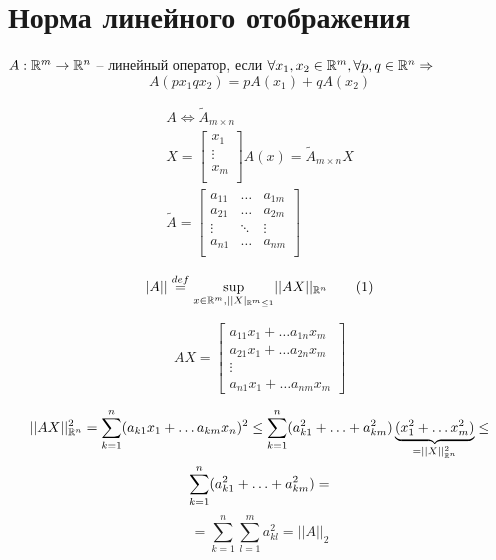 \documentclass[main]{subfiles}
\begin{document}
\chapter{Норма линейного отображения}
\begin{definition}
    $A: {\mathbb{R}}^m \rightarrow {\mathbb{R}}^n$ -- линейный оператор, если
    $ \forall x_1, x_2 \in {\mathbb{R}}^m, \forall p, q \in {\mathbb{R}}^n \Rightarrow$
    \[A(px_1 qx_2) = pA(x_1) + qA(x_2)\]
\end{definition}
\begin{gather*}
    A \Leftrightarrow \tilde{A}_{m \times n} \\
    X =
        \begin{bmatrix}
            x_1 \\
            \vdots \\
            x_m  \\
        \end{bmatrix}
    A(x) = \tilde{A}_{m \times n} X \\
    \tilde{A} = 
    \begin{bmatrix}
        a_{11} & \ldots & a_{1m} \\
        a_{21} & \ldots & a_{2m} \\
        \vdots & \ddots & \vdots \\
        a_{n1} & \ldots & a_{nm} \\
    \end{bmatrix}
\end{gather*}

\begin{definition}
    \[|A|| \stackrel{def}{=} \underset{x \in {\mathbb{R}}^m, ||X|_{{\mathbb{R}}^m \leq 1}}{\sup}
     {||AX||_{{\mathbb{R}}^n}} \tag{1} \]
\end{definition}


\[AX = \begin{bmatrix}
    a_{11}x_1 + \ldots a_{1n}x_m \\
    a_{21}x_1 + \ldots a_{2n}x_m \\
    \vdots \\
    a_{n1}x_1 + \ldots a_{nm}x_m
\end{bmatrix}\]



\begin{multline*}
    ||AX||^2_{{\mathbb{R}}^n} = \sum_{k=1}^n(a_{k1}x_1 + \ldots a_{km}x_n)^2 \leq 
    \sum_{k=1}^n (a^2_{k1} + \ldots + a^2_{km})\underbrace{(x_1^2 + \ldots x_m^2)}_{=||X||^2_{{\mathbb{R}}^n}} \leq \\
    \sum_{k=1}^n (a^2_{k1} + \ldots + a^2_{km}) =
\end{multline*}
     \[=\sum_{k=1}^n \sum_{l=1}^m a_{kl}^2 =||A||_2  \tag{2}\]
\end{document}
